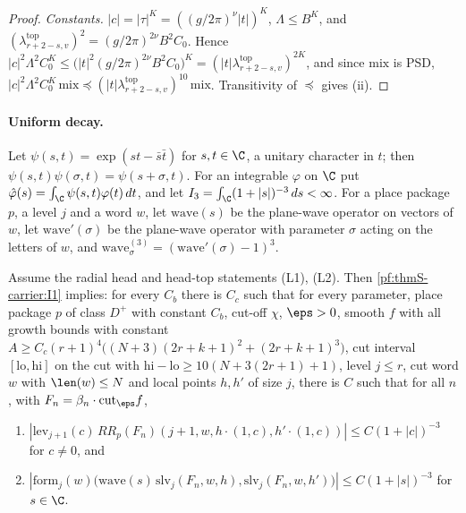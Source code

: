 \begin{proof}
\emph{Constants.} $|c|=|\tau|^K=((g/2\pi)^\nu|t|)^K$, $\Lambda\le B^K$, and $(\lambda^{\mathrm{top}}_{r+2-s,v})^2=
(g/2\pi)^{2\nu}B^2C_0$. Hence
$|c|^2\Lambda^2C_0^K\le\bigl(|t|^2(g/2\pi)^{2\nu}B^2C_0\bigr)^K=(|t|\lambda^{\mathrm{top}}_{r+2-s,v})^{2K}$, and since
$\mathrm{mix}$ is PSD, $|c|^2\Lambda^2C_0^K\,\mathrm{mix}\preceq(|t|\lambda^{\mathrm{top}}_{r+2-s,v})^{10}\,\mathrm{mix}$.
Transitivity of $\preceq$ gives (ii).
\end{proof}

\paragraph{Uniform decay.}
Let $\psi(s,t)=\exp(st-\bar s\bar t)$ for $s,t\in\C$, a unitary character in $t$; then $\psi(s,t)\psi(\sigma,t)=\psi(s+\sigma,t)$.
For an integrable $\varphi$ on $\C$ put $\hat\varphi(s)=\int_\C\psi(s,t)\varphi(t)\,dt$, and let
$I_3=\int_\C(1+|s|)^{-3}\,ds<\infty$. For a place package $p$, a level $j$ and a word $w$, let $\mathrm{wave}(s)$ be the
plane-wave operator on vectors of $w$, let $\mathrm{wave}'(\sigma)$ be the plane-wave operator with parameter $\sigma$ acting on
the letters of $w$, and $\mathrm{wave}^{(3)}_\sigma=(\mathrm{wave}'(\sigma)-1)^3$.

\begin{theorem}\label{pf:thmS-carrier:unifdecay}
Assume the radial head and head-top statements (L1), (L2). Then \ref{pf:thmS-carrier:I1} implies: for every $C_b$ there is $C_c$
such that for every parameter, place package $p$ of class $D^+$ with constant $C_b$, cut-off $\chi$, $\eps>0$, smooth $f$ with
all growth bounds with constant $A\ge C_c(r+1)^4\bigl((N+3)(2r+k+1)^2+(2r+k+1)^3\bigr)$, cut interval $[\mathrm{lo},\mathrm{hi}]$
on the cut with $\mathrm{hi}-\mathrm{lo}\ge10(N+3(2r+1)+1)$, level $j\le r$, cut word $w$ with $\len(w)\le N$ and local points
$h,h'$ of size $j$, there is $C$ such that for all $n$, with $F_n=\beta_n\cdot\mathrm{cut}_\eps f$,
\begin{enumerate}[label=(\roman*)]
\item $|\mathrm{lev}_{j+1}(c)\,RR_p(F_n)(j+1,w,h\cdot(1,c),h'\cdot(1,c))|\le C(1+|c|)^{-3}$ for $c\ne0$, and
\item $|\mathrm{form}_j(w)\bigl(\mathrm{wave}(s)\,\mathrm{slv}_j(F_n,w,h),\mathrm{slv}_j(F_n,w,h')\bigr)|\le C(1+|s|)^{-3}$ for
  $s\in\C$.
\end{enumerate}
\end{theorem}


